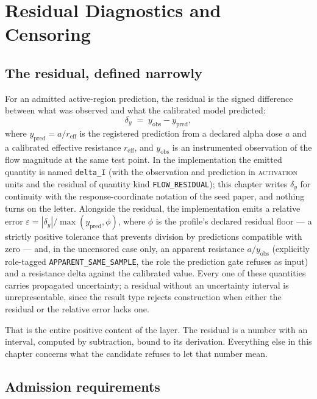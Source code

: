 \chapter{Residual Diagnostics and Censoring}\label{ch10:residuals}

\section{The residual, defined narrowly}\label{ch10:sec:definition}

For an admitted active-region prediction, the residual is the signed
difference between what was observed and what the calibrated model
predicted:
\[
\delta_y \;=\; y_{\mathrm{obs}} - y_{\mathrm{pred}},
\]
where $y_{\mathrm{pred}} = a / r_{\mathrm{eff}}$ is the registered
prediction from a declared alpha dose $a$ and a calibrated effective
resistance $r_{\mathrm{eff}}$, and $y_{\mathrm{obs}}$ is an instrumented
observation of the flow magnitude at the same test point. In the
implementation the emitted quantity is named \texttt{delta\_I} (with the
observation and prediction in \textsc{activation} units and the residual
of quantity kind \texttt{FLOW\_RESIDUAL}); this chapter writes
$\delta_y$ for continuity with the response-coordinate notation of the
seed paper, and nothing turns on the letter. Alongside the residual, the
implementation emits a relative error
$\varepsilon = |\delta_y| / \max(y_{\mathrm{pred}}, \phi)$, where $\phi$
is the profile's declared residual floor --- a strictly positive
tolerance that prevents division by predictions compatible with zero ---
and, in the uncensored case only, an apparent resistance
$a / y_{\mathrm{obs}}$ (explicitly role-tagged
\texttt{APPARENT\_SAME\_SAMPLE}, the role the prediction gate refuses as
input) and a resistance delta against the calibrated value. Every one of
these quantities carries propagated uncertainty; a residual without an
uncertainty interval is unrepresentable, since the result type rejects
construction when either the residual or the relative error lacks one.

That is the entire positive content of the layer. The residual is a
number with an interval, computed by subtraction, bound to its
derivation. Everything else in this chapter concerns what the candidate
refuses to let that number mean.

\section{Admission requirements}\label{ch10:sec:admission}

